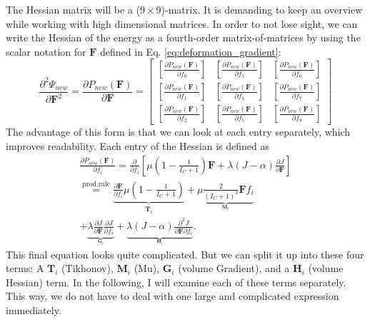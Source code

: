 {{{The Hessian matrix will be a ($9 \times 9$)-matrix. It is demanding to keep an overview while working with high dimensional matrices. In order to not lose sight, we can write the Hessian of the energy as a fourth-order matrix-of-matrices by using the scalar notation for $\mathbf{F}$ defined in Eq. \eqref{eq:deformation_gradient}:
\[
\frac{\partial^2 \Psi_{new}}{\partial \mathbf{F}^2} = \frac{\partial P_{new}(\mathbf{F})}{\partial \mathbf{F}} = 
\left[\begin{array}{ccc}{\left[\frac{\partial P_{new}(\mathbf{F})}{\partial f_0}\right]} & {\left[\frac{\partial P_{new}(\mathbf{F})}{\partial f_3}\right]} & {\left[\frac{\partial P_{new}(\mathbf{F})}{\partial f_6}\right]} \\ {\left[\frac{\partial P_{new}(\mathbf{F})}{\partial f_1}\right]} & {\left[\frac{\partial P_{new}(\mathbf{F})}{\partial f_4}\right]} & {\left[\frac{\partial P_{new}(\mathbf{F})}{\partial f_7}\right]} \\ {\left[\frac{\partial P_{new}(\mathbf{F})}{\partial f_2}\right]} & {\left[\frac{\partial P_{new}(\mathbf{F})}{\partial f_5}\right]} & {\left[\frac{\partial P_{new}(\mathbf{F})}{\partial f_8}\right]} \end{array}\right]
\]
The advantage of this form is that we can look at each entry separately, which improves readability. Each entry of the Hessian is defined as
\begingroup
\addtolength{\jot}{0.8em}
\begin{align} \label{eq:final_entries_hessian}
	\frac{\partial P_{new}(\mathbf{F})}{\partial f_i} = \frac{\partial}{\partial f_i} \left[ \mu \left( 1 - \frac{1}{I_{C} + 1}\right) \mathbf{F} + \lambda(J-\alpha)\frac{\partial J}{\partial \mathbf{F}} \right] \nonumber
	\\
	\stackrel{\text{prod.rule}}{=} \underbrace{\frac{\partial \mathbf{F}}{\partial f_i} \mu \left( 1 - \frac{1}{I_{C} + 1}\right)}_{\mathbf{T}_{i}}  + \underbrace{\mu \frac{2}{\left(I_{C} + 1\right)^2} \mathbf{F} f_i}_{_{\mathbf{M}_{i}}}
	\\
	+ \underbrace{\lambda \frac{\partial J}{\partial \mathbf{F}} \frac{\partial J}{\partial f_i}}_{_{\mathbf{G}_{i}}}+ \underbrace{\lambda (J- \alpha) \frac{\partial^2 J}{\partial \mathbf{F}\partial f_i}}_{_{\mathbf{H}_{i}}}. \nonumber
\end{align}
\endgroup
This final equation looks quite complicated. But we can split it up into these four terms: A $\mathbf{T}_i$ (Tikhonov), $\mathbf{M}_i$ (Mu), $\mathbf{G}_i$ (volume Gradient), and a $\mathbf{H}_i$ (volume Hessian) term. In the following, I will examine each of these terms separately. This way, we do not have to deal with one large and complicated expression immediately.

}}}
